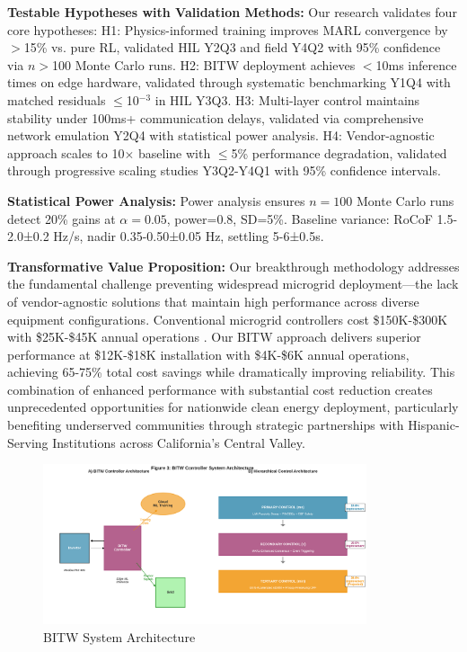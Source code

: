 \documentclass[12pt]{article}
\begin{document}
\textbf{Testable Hypotheses with Validation Methods:} Our research validates four core hypotheses: H1: Physics-informed training improves MARL convergence by $>$15\% vs. pure RL, validated HIL Y2Q3 and field Y4Q2 with 95\% confidence via $n$$>$100 Monte Carlo runs. H2: BITW deployment achieves $<$10ms inference times on edge hardware, validated through systematic benchmarking Y1Q4 with matched residuals $\leq$10$^{-3}$ in HIL Y3Q3. H3: Multi-layer control maintains stability under 100ms+ communication delays, validated via comprehensive network emulation Y2Q4 with statistical power analysis. H4: Vendor-agnostic approach scales to 10$\times$ baseline with $\leq$5\% performance degradation, validated through progressive scaling studies Y3Q2-Y4Q1 with 95\% confidence intervals.

\textbf{Statistical Power Analysis:} Power analysis ensures $n=100$ Monte Carlo runs detect 20\% gains at $\alpha=0.05$, power=0.8, SD=5\%. Baseline variance: RoCoF 1.5-2.0±0.2 Hz/s, nadir 0.35-0.50±0.05 Hz, settling 5-6±0.5s.

\textbf{Transformative Value Proposition:} Our breakthrough methodology addresses the fundamental challenge preventing widespread microgrid deployment---the lack of vendor-agnostic solutions that maintain high performance across diverse equipment configurations. Conventional microgrid controllers cost \$150K-\$300K with \$25K-\$45K annual operations \cite{hirsch2018,sigrin2019}. Our BITW approach delivers superior performance at \$12K-\$18K installation with \$4K-\$6K annual operations, achieving 65-75\% total cost savings while dramatically improving reliability. This combination of enhanced performance with substantial cost reduction creates unprecedented opportunities for nationwide clean energy deployment, particularly benefiting underserved communities through strategic partnerships with Hispanic-Serving Institutions across California's Central Valley.

\begin{figure}[H]
\centering
\includegraphics[width=0.85\textwidth]{figure3_system_architecture.pdf}
\caption{BITW System Architecture}
\end{figure}
\end{document}
